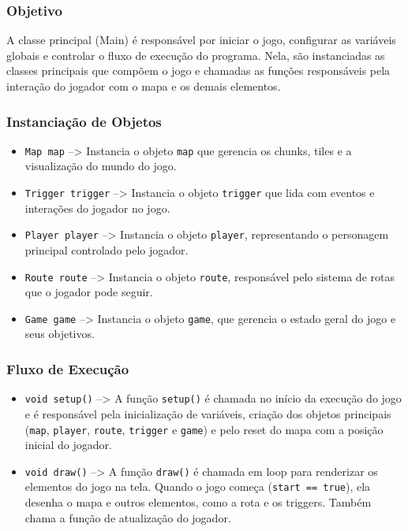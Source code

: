 \documentclass[
	12pt,				%
	oneside,			%
	a4paper,			%
	english,			%
	brazil,				%
	]{abntex2}
\begin{document}
{\subsubsection{Objetivo}
A classe principal (Main) é responsável por iniciar o jogo, configurar as variáveis globais e controlar o fluxo de execução do programa. Nela, são instanciadas as classes principais que compõem o jogo e chamadas as funções responsáveis pela interação do jogador com o mapa e os demais elementos.

\subsubsection{Instanciação de Objetos}

\begin{itemize}
    \item \texttt{Map map} --> Instancia o objeto \texttt{map} que gerencia os chunks, tiles e a visualização do mundo do jogo.
    \item \texttt{Trigger trigger} --> Instancia o objeto \texttt{trigger} que lida com eventos e interações do jogador no jogo.
    \item \texttt{Player player} --> Instancia o objeto \texttt{player}, representando o personagem principal controlado pelo jogador.
    \item \texttt{Route route} --> Instancia o objeto \texttt{route}, responsável pelo sistema de rotas que o jogador pode seguir.
    \item \texttt{Game game} --> Instancia o objeto \texttt{game}, que gerencia o estado geral do jogo e seus objetivos.
\end{itemize}

\subsubsection{Fluxo de Execução}

\begin{itemize}
    \item \texttt{void setup()} --> A função \texttt{setup()} é chamada no início da execução do jogo e é responsável pela inicialização de variáveis, criação dos objetos principais (\texttt{map}, \texttt{player}, \texttt{route}, \texttt{trigger} e \texttt{game}) e pelo reset do mapa com a posição inicial do jogador.
    
    \item \texttt{void draw()} --> A função \texttt{draw()} é chamada em loop para renderizar os elementos do jogo na tela. Quando o jogo começa (\texttt{start == true}), ela desenha o mapa e outros elementos, como a rota e os triggers. Também chama a função de atualização do jogador.
    

\end{itemize}}
\end{document}
